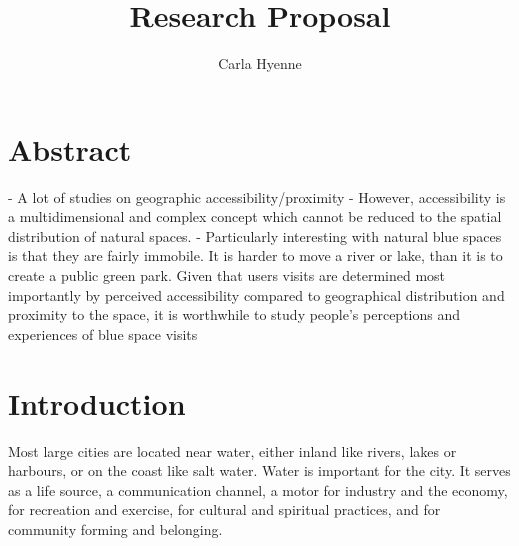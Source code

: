 \documentclass{article}
\title{Research Proposal}
\author{Carla Hyenne}
\date{}
\begin{document}
\maketitle

\tableofcontents 


\section{Abstract}

- A lot of studies on geographic accessibility/proximity
- However, accessibility is a multidimensional and complex concept which cannot be reduced to the spatial distribution of natural spaces. 
- Particularly interesting with natural blue spaces is that they are fairly immobile. It is harder to move a river or lake, than it is to create a public green park. Given that users visits are determined most importantly by perceived accessibility compared to geographical distribution and proximity to the space, it is worthwhile to study people's perceptions and experiences of blue space visits


\section{Introduction}


Most large cities are located near water, either inland like rivers, lakes or harbours, or on the coast like salt water. Water is important for the city. It serves as a life source, a communication channel, a motor for industry and the economy, for recreation and exercise, for cultural and spiritual practices, and for community forming and belonging. 
\end{document}
